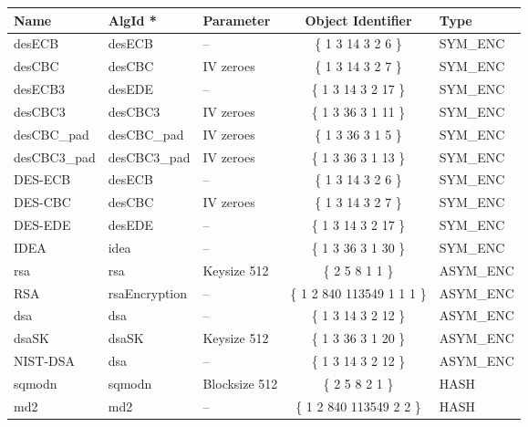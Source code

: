{\scriptsize
\begin{tabular}{|l|l|l|c|l|} \hline
{\bf Name}      & {\bf AlgId *}      &  {\bf Parameter}  & {\bf Object Identifier}    & {\bf Type}   \\ \hline
desECB          & desECB             &  --               & \{ 1 3 14 3 2 6 \}         & SYM\_ENC \\
desCBC          & desCBC             &  IV zeroes        & \{ 1 3 14 3 2 7 \}         & SYM\_ENC \\
desECB3         & desEDE             &  --               & \{ 1 3 14 3 2 17 \}        & SYM\_ENC \\
desCBC3         & desCBC3            &  IV zeroes        & \{ 1 3 36 3 1 11 \}        & SYM\_ENC \\
desCBC\_pad     & desCBC\_pad        &  IV zeroes        & \{ 1 3 36 3 1 5 \}         & SYM\_ENC \\
desCBC3\_pad    & desCBC3\_pad       &  IV zeroes        & \{ 1 3 36 3 1 13 \}        & SYM\_ENC \\
DES-ECB         & desECB             &  --               & \{ 1 3 14 3 2 6 \}         & SYM\_ENC \\
DES-CBC         & desCBC             &  IV zeroes        & \{ 1 3 14 3 2 7 \}         & SYM\_ENC \\
DES-EDE         & desEDE             &  --               & \{ 1 3 14 3 2 17 \}        & SYM\_ENC \\ IDEA            & idea               &  --               & \{ 1 3 36 3 1 30 \}        & SYM\_ENC \\
rsa             & rsa                &  Keysize 512      & \{ 2 5 8 1 1 \}            & ASYM\_ENC \\
RSA             & rsaEncryption      &  --               & \{ 1 2 840 113549 1 1 1 \} & ASYM\_ENC \\
dsa             & dsa                &  --               & \{ 1 3 14 3 2 12 \}        & ASYM\_ENC \\
dsaSK           & dsaSK              &  Keysize 512      & \{ 1 3 36 3 1 20 \}        & ASYM\_ENC \\
NIST-DSA        & dsa                &  --               & \{ 1 3 14 3 2 12 \}        & ASYM\_ENC \\
sqmodn          & sqmodn             &  Blocksize 512    & \{ 2 5 8 2 1 \}            & HASH \\
md2             & md2                &  --               & \{ 1 2 840 113549 2 2 \}   & HASH \\

\end{tabular}}
